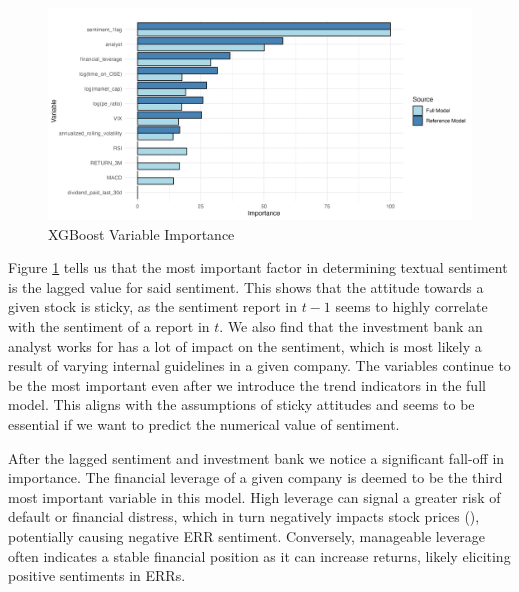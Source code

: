 \clearpage

\begin{figure}[H]
    \centering
    \includegraphics[width=1\textwidth]{Images/variable_imp.png}
    \caption{XGBoost Variable Importance}
    \label{fig:varImp}
\end{figure}

Figure \ref{fig:varImp} tells us that the most important factor in determining textual sentiment is the lagged value for said sentiment. This shows that the attitude towards a given stock is sticky, as the sentiment report in \(t-1\) seems to highly correlate with the sentiment of a report in \(t\). We also find that the investment bank an analyst works for has a lot of impact on the sentiment, which is most likely a result of varying internal guidelines in a given company. The variables continue to be the most important even after we introduce the trend indicators in the full model. This aligns with the assumptions of sticky attitudes and seems to be essential if we want to predict the numerical value of sentiment.

After the lagged sentiment and investment bank we notice a significant fall-off in importance. The financial leverage of a given company is deemed to be the third most important variable in this model. High leverage can signal a greater risk of default or financial distress, which in turn negatively impacts stock prices (\cite{cai2011leverage}), potentially causing negative ERR sentiment. Conversely, manageable leverage often indicates a stable financial position as it can increase returns, likely eliciting positive sentiments in ERRs. 

